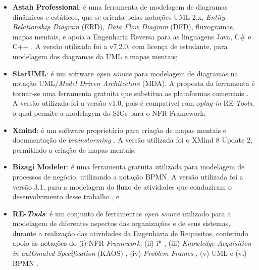 \begin{itemize}
	\item \textbf{Astah Professional}: é uma ferramenta de modelagem de diagramas dinâmicos e estáticos, que se orienta pelas notações UML 2.x, \textit{Entity Relationship Diagram} (ERD), \textit{Data Flow Diagram} (DFD), fluxogramas, mapas mentais, e apoia a Engenharia Reversa para as linguagens Java, C\# e C++ \cite{astah}. A versão utilizada foi a v7.2.0, com licença de estudante, para modelagem dos diagramas da UML e mapas mentais;   
	
	\item \textbf{StarUML}: é um software \textit{open source} para modelagem de diagramas na notação UML/\textit{Model Driven Architecture} (MDA). A proposta da ferramenta é tornar-se uma ferramenta gratuita que substitua as plataformas comerciais \cite{starUML}. A versão utilizada foi a versão v1.0, pois é compatível com o\textit{plug-in} RE-\textit{Tools}, o qual permite a modelagem do SIGs para o NFR Framework;
	
	\begin{comment}
		\item \textbf{OpenOME}: É uma ferramenta \textit{open source} de modelagem para apoiar a Engenharia Requisitos Orientada à Meta, orientada a agente e orientada a aspectos. Promove ao desenvolvedor um vínculo entre os requisitos e as especificações e as fases do \textit{design} arquitetural \cite{openOME}. A versão utilizada foi a v3.4.1, para modelagem na notação do i*.
	\end{comment}
	
	\item \textbf{Xmind}: é um software proprietário para criação de mapas mentais e documentação de \textit{brainstorming} \cite{xMind}. A versão utilizada foi o XMind 8 Update 2, permitindo a criação de mapas mentais; 
	
	\item \textbf{Bizagi Modeler}: é uma ferramenta gratuita utilizada para modelagem de processos de negócio, utilizando a notação BPMN. A versão utilizada foi a versão 3.1, para a modelagem do fluxo de atividades que conduziram o desenvolvimento desse trabalho \cite{bizagi}, e 
	
	\item \textbf{RE-\textit{Tools}}: é um conjunto de ferramentas \textit{open source} utilizado para a modelagem de diferentes aspectos das organizações e de seus sistemas, durante a realização das atividades da Engenharia de Requisitos, conferindo apoio às notações do (i) NFR \textit{Framework}, (ii) i* \cite{istarwiki20}, (iii) \textit{Knowledge Acquisition in autOmated Specification} (KAOS) \cite{van2001goal}, (iv) \textit{Problem Frames} \cite{jackson2005problem}, (v) UML e (vi) BPMN \cite{reTools} \cite{supakkul2012re}.
	

\end{itemize}
